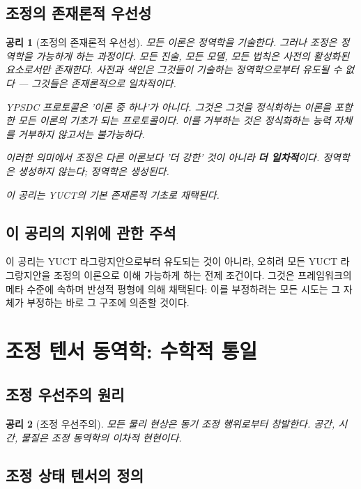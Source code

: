 \documentclass[11pt,a4paper]{article}
\newtheorem{axiom}{공리}
\begin{document}
	\subsection{조정의 존재론적 우선성}
	\begin{axiom}[조정의 존재론적 우선성]
		모든 이론은 정역학을 기술한다. 그러나 조정은 정역학을 가능하게 하는 과정이다.
		모든 진술, 모든 모델, 모든 법칙은 사전의 활성화된 요소로서만 존재한다.
		사전과 색인은 그것들이 기술하는 정역학으로부터 유도될 수 없다 — 그것들은 존재론적으로 일차적이다.
		
		YPSDC 프로토콜은 '이론 중 하나'가 아니다.
		그것은 그것을 정식화하는 이론을 포함한 모든 이론의 기초가 되는 프로토콜이다.
		이를 거부하는 것은 정식화하는 능력 자체를 거부하지 않고서는 불가능하다.
		
		이러한 의미에서 조정은 다른 이론보다 '더 강한' 것이 아니라 \textbf{더 일차적}이다.
		정역학은 생성하지 않는다; 정역학은 생성된다.
		
		이 공리는 YUCT의 기본 존재론적 기초로 채택된다.
	\end{axiom}
	\subsection*{이 공리의 지위에 관한 주석}
	이 공리는 YUCT 라그랑지안으로부터 유도되는 것이 아니라, 오히려 모든 YUCT 라그랑지안을 조정의 이론으로 이해 가능하게 하는 전제 조건이다. 그것은 프레임워크의 메타 수준에 속하며 반성적 평형에 의해 채택된다: 이를 부정하려는 모든 시도는 그 자체가 부정하는 바로 그 구조에 의존할 것이다.
	
	\section{조정 텐서 동역학: 수학적 통일}
	\label{sec:ctd-unification}
	
	\subsection{조정 우선주의 원리}
	\begin{axiom}[조정 우선주의]
		모든 물리 현상은 동기 조정 행위로부터 창발한다.
		공간, 시간, 물질은 조정 동역학의 이차적 현현이다.
	\end{axiom}
	
	\subsection{조정 상태 텐서의 정의}
	
\end{document}

